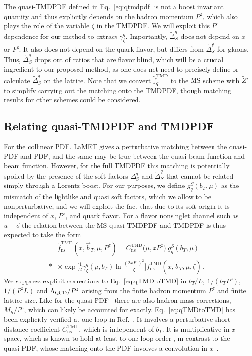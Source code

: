 \documentclass[prd,aps,twocolumn,bibnotes,nofootinbib,preprintnumbers,floatfix]{revtex4-1}
\DeclareRobustCommand{\eq}[1]{Eq.~\eqref{eq:#1}}
\newcommand{\nn}{\nonumber}
\newcommand{\LQCD}{\Lambda_{\rm QCD}}
\newcommand{\bt}{\vec b_T}
\newcommand{\MS}{\overline{\mathrm{MS}}}
\newcommand{\ns}{{\text{ns}}}
\newcommand\TMD{\mathrm{TMD}}
\begin{document}
The quasi-TMDPDF defined in \eq{qtmdpdf} is not a boost invariant quantity and thus explicitly depends on the hadron momentum $P^z$, which also plays the role of the variable $\zeta$ in the TMDPDF. We will exploit this $P^z$ dependence for our method to extract $\gamma_\zeta^q$. Importantly, $\tilde\Delta_S^q$ does not depend on $x$ or $P^z$.
It also does not depend on the quark flavor, but differs from $\tilde\Delta_S^g$ for gluons.
Thus, $\tilde\Delta_S^q$ drops out of ratios that are flavor blind, which will be a crucial ingredient to our proposed method, as one does not need to precisely define or calculate $\tilde\Delta_S^q$ on the lattice. Note that we convert $\tilde f_q^\TMD$ to the $\MS$ scheme with $\tilde Z'$ to simplify carrying out the matching onto the TMDPDF, though matching results for other schemes could be considered.

\subsection{Relating quasi-TMDPDF and TMDPDF}

For the collinear PDF, LaMET gives a perturbative matching between the quasi-PDF and PDF, and the same may be true between the quasi beam function and beam function. However, for the full TMDPDF this matching is potentially spoiled by the presence of the soft factors $\Delta_S^q$ and $\tilde\Delta_S^q$ that cannot be related simply through a Lorentz boost. For our purposes, we define $g^S_q(b_T,\mu)$ as the mismatch of the lightlike and quasi soft factors, which we allow to be nonperturbative, and we will exploit the fact that due to its soft origin it is  independent of $x$, $P^z$, and quark flavor. For a flavor nonsinglet channel such as $u{-}d$ the relation between the $\MS$ quasi-TMDPDF and TMDPDF is thus expected to take the form \cite{Ebert:2019okf}
\begin{align} \label{eq:qTMDtoTMD}
 &\tilde f_\ns^\TMD(x, \bt, \mu, P^z)
 = C^\TMD_\ns\bigl(\mu, x P^z\bigr)
  \: g^S_q(b_T,\mu)
\nn\\*&\times
   \exp\biggl[\frac12\gamma_\zeta^q(\mu, b_T) \ln\frac{(2 x P^z)^2}{\zeta}  \biggr]
    f^\TMD_\ns(x, \bt, \mu, \zeta)
\,.\end{align}
We suppress explicit corrections to \eq{qTMDtoTMD} in $b_T/L$, $1/(b_T P^z)$, $1/(P^z L)$ and $\LQCD/P^z$ arising from the finite hadron momentum $P^z$ and finite lattice size. Like for the quasi-PDF~\cite{Chen:2016utp} there are also hadron mass corrections, $M_h/P^z$, which can likely be accounted for exactly.
\eq{qTMDtoTMD} has been explicitly verified at one loop in Ref.~\cite{Ebert:2019okf}.
It involves a perturbative short distance coefficient $C_\ns^\TMD$, which is independent of $b_T$.
It is multiplicative in $x$ space, which is known to hold at least to one-loop order \cite{Ji:2018hvs,Ebert:2019okf},
in contrast to the quasi-PDF, whose matching onto the PDF involves a convolution in $x$~\cite{Xiong:2013bka}.
\end{document}
